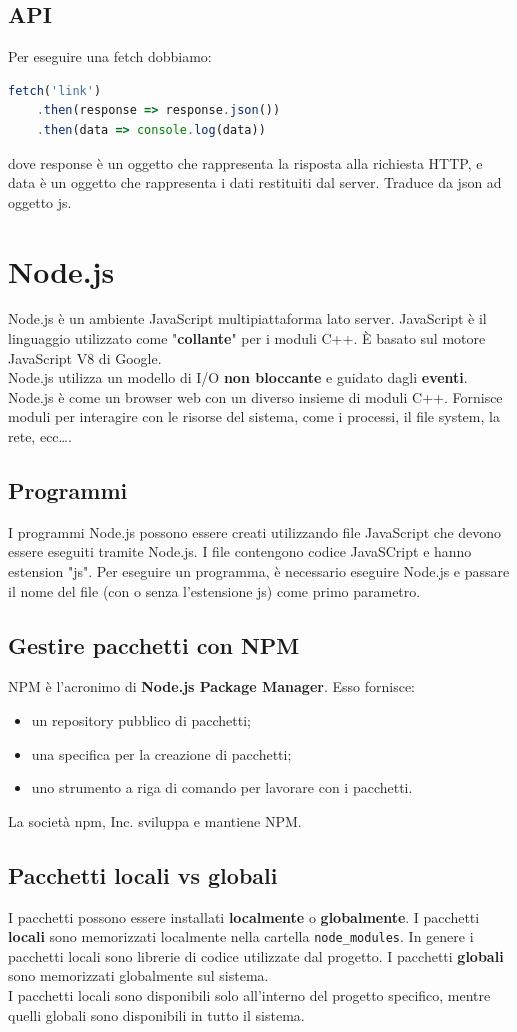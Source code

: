 \documentclass{article}
\begin{document}
\subsection{API}
Per eseguire una fetch dobbiamo:
\begin{lstlisting}[language=JavaScript]
fetch('link')
    .then(response => response.json())
    .then(data => console.log(data))
\end{lstlisting}
dove response è un oggetto che rappresenta la risposta alla richiesta HTTP, e data è un oggetto che rappresenta i dati restituiti dal server. Traduce da json ad oggetto js.
\section{Node.js}
Node.js è un ambiente JavaScript multipiattaforma lato server. JavaScript è il linguaggio utilizzato come "\textbf{collante}" per i moduli C++. È basato sul motore JavaScript V8 di Google.
\\ Node.js utilizza un modello di I/O \textbf{non bloccante} e guidato dagli \textbf{eventi}. Node.js è come un browser web con un diverso insieme di moduli C++. Fornisce moduli per interagire
con le risorse del sistema, come i processi, il file system, la rete, ecc\dots.
\subsection{Programmi}
I programmi Node.js possono essere creati utilizzando file JavaScript che devono essere eseguiti tramite Node.js. I file contengono codice JavaSCript e hanno estension "js". Per eseguire un programma, è necessario eseguire Node.js e passare il nome del file
(con o senza l'estensione js) come primo parametro.
\subsection{Gestire pacchetti con NPM}
NPM è l'acronimo di \textbf{Node.js Package Manager}. Esso fornisce:
\begin{itemize}
    \item un repository pubblico di pacchetti;
    \item una specifica per la creazione di pacchetti;
    \item uno strumento a riga di comando per lavorare con i pacchetti.
\end{itemize}
La società npm, Inc. sviluppa e mantiene NPM.
\subsection{Pacchetti locali vs globali}
I pacchetti possono essere installati \textbf{localmente} o \textbf{globalmente}. I pacchetti \textbf{locali} sono memorizzati localmente nella cartella \texttt{node\_modules}. In genere i pacchetti locali sono librerie di codice utilizzate dal progetto.
I pacchetti \textbf{globali} sono memorizzati globalmente sul sistema.
\\ I pacchetti locali sono disponibili solo all'interno del progetto specifico, mentre quelli globali sono disponibili in tutto il sistema.
\end{document}
